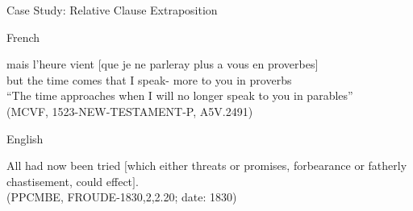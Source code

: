 \documentclass[hyperref={pdfpagelabels=false}]{beamer}
\begin{document}
\begin{frame}{Case Study: Relative Clause Extraposition}

	\begin{block}{French}
		\begin{exe}
			\ex \gll mais l'heure vient $[$que je ne parleray plus a vous en proverbes$]$\\
			but {the time} comes { }that I  speak- more to you in proverbs\\
			\quad ``The time approaches when I will no longer speak to you in parables''\\
			(MCVF, 1523-NEW-TESTAMENT-P, A5V.2491)
		\end{exe}
	\end{block}
	
	\begin{block}{English}
		\begin{exe}
			\ex All had now been tried $[$which either threats or promises, forbearance or
fatherly chastisement, could effect$]$.\\
			(PPCMBE, FROUDE-1830,2,2.20; date: 1830)
		\end{exe}
	\end{block}


\end{frame}





\end{document}
